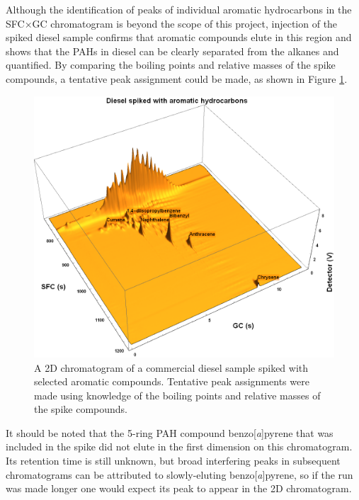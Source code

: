 Although the identification of peaks of individual aromatic hydrocarbons in the
SFC×GC chromatogram is beyond the scope of this project, injection of the spiked
diesel sample confirms that aromatic compounds elute in this region and shows
that the PAHs in diesel can be clearly separated from the alkanes and
quantified. By comparing the boiling points and relative masses of the spike
compounds, a tentative peak assignment could be made, as shown in Figure
\ref{fig:Spiked_Diesel_Annotated}.

\begin{figure}
	\centering
	\includegraphics[width=\textwidth]{Figures/Spiked_Diesel_Annotated.png}
	\decoRule	
	
\caption[Peak assignment in spiked diesel sample.]{A 2D chromatogram of a
commercial diesel sample spiked with selected aromatic compounds. Tentative peak
assignments were made using knowledge of the boiling points and relative masses
of the spike compounds.}

	\label{fig:Spiked_Diesel_Annotated} 
\end{figure}

It should be noted that the 5-ring PAH compound benzo[\textit{a}]pyrene that was
included in the spike did not elute in the first dimension on this chromatogram.
Its retention time is still unknown, but broad interfering peaks in subsequent
chromatograms can be attributed to slowly-eluting benzo[\textit{a}]pyrene, so if
the \oneD run was made longer one would expect its peak to appear in the 2D
chromatogram.

